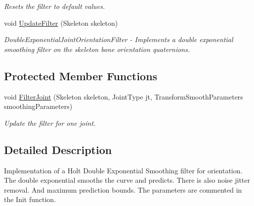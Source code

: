 \begin{DoxyCompactItemize}
\begin{DoxyCompactList}\small\item\em Resets the filter to default values. \end{DoxyCompactList}\item 
void \hyperlink{class_microsoft_1_1_samples_1_1_kinect_1_1_avateering_1_1_filters_1_1_bone_orientation_double_exponential_filter_aa251508e7e97090475363c371cc0a595}{Update\+Filter} (Skeleton skeleton)
\begin{DoxyCompactList}\small\item\em Double\+Exponential\+Joint\+Orientation\+Filter -\/ Implements a double exponential smoothing filter on the skeleton bone orientation quaternions. \end{DoxyCompactList}\end{DoxyCompactItemize}
\subsection*{Protected Member Functions}
\begin{DoxyCompactItemize}
\item 
void \hyperlink{class_microsoft_1_1_samples_1_1_kinect_1_1_avateering_1_1_filters_1_1_bone_orientation_double_exponential_filter_a8f88f7fd4bb8f00569eafe15b74b2331}{Filter\+Joint} (Skeleton skeleton, Joint\+Type jt, Transform\+Smooth\+Parameters smoothing\+Parameters)
\begin{DoxyCompactList}\small\item\em Update the filter for one joint. \end{DoxyCompactList}\end{DoxyCompactItemize}


\subsection{Detailed Description}
Implementation of a Holt Double Exponential Smoothing filter for orientation. The double exponential smooths the curve and predicts. There is also noise jitter removal. And maximum prediction bounds. The parameters are commented in the Init function. 



